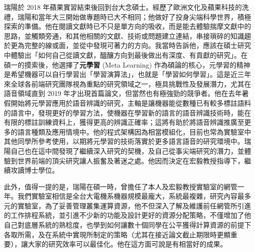 \documentclass[14pt,UTF8,fntef]{memoir}
\begin{document}
\vspace{1.5em}

瑞陽於 2018 年蘋果實習結束後回到台大念碩士。經歷了歐洲文化及蘋果科技的洗禮，瑞陽和當年大三開始做專題時已大不相同；他做好了投身尖端科學世界，積極探索的準備。他在閱讀文獻時已不只是單方向的吸收，而是能去體驗揣摩文獻中的思路，並觸類旁通，和其他相關的文獻、技術或問題建立連結，串接瑣碎的知識趨於更為完整的線或面，並從中發現可著力的方向。我當時告訴他，應該在碩士研究中體驗出「如何自己從讀文獻，醞釀方向到最後做出有深度、有貢獻的研究」。在碩一的摸索後，他選擇了\textbf{元學習} (Meta Learning) 作為碩論的核心，元學習的精神是希望機器可以自行學習出「學習演算法」，也就是「學習如何學習」。這是近三年來全球各前端研究團隊視為重點的研究領域之一，極具挑戰性及發展潛力，尤其在語音領域直到 2019 年才出現首篇論文，但當然也有極強勁的競爭者。他在去年暑假開始將元學習應用於語音辨識的研究，主軸是讓機器能從數種已有較多標註語料的語言中，發現更好的學習方法，使機器在學習新的語言的語音辨識技術時，能在有限的標註訓練資料上，獲得更高的辨識正確率；這將有助於將語音辨識推廣至更多的語言種類及應用情境中。他的程式架構因為相當模組化，目前也常為實驗室中其他同學所參考使用，以期將元學習的技術落實於更多語言語音的研究環境中。瑞陽自己也在這中間發現了繼續深入研究的契機，及自己從事尖端研究的潛力，並體驗到世界前端的頂尖研究讓人振奮及著迷之處。他因而決定在宏毅教授指導下，繼續攻讀博士學位。


\vspace{1.5em}

此外，值得一提的是，瑞陽在碩一時，曾擔任了本人及宏毅教授實驗室的網管一年。我們實驗室相信是全台大電機系機器規模最龐大，系統最複雜，研究內容最多元的實驗室，為了妥善管理叢集運算資源，他不但深入了解及維護前任網管所引進的工作排程系統，並引進不少新的功能及設計更好的資源分配策略，不僅增加了他自己對底層系統的熟稔度，也學到如何讓數十個同學在公平獲得計算資源的前提下各取所需，及在系統中實現所制定的策略（尤其在接近論文截止期限時更顯重要），讓大家的研究效率可以最佳化。他在這方面可說是有相當好的成果。
\end{document}
